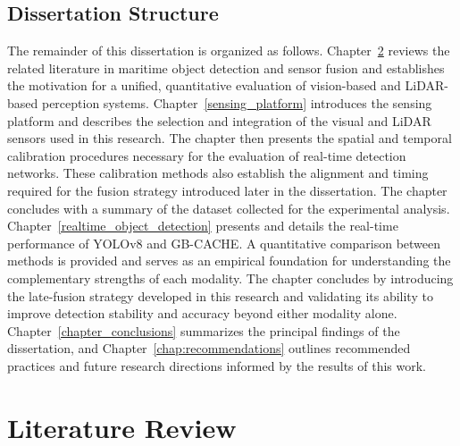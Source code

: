 \documentclass{erauthesis}
\begin{document}
\section{Dissertation Structure}
The remainder of this dissertation is organized as follows.  
Chapter~\ref{litReview} reviews the related literature in maritime object detection and sensor fusion and establishes the motivation for a unified, quantitative evaluation of vision-based and LiDAR-based perception systems.
Chapter~\ref{sensing_platform} introduces the sensing platform and describes the selection and integration of the visual and LiDAR sensors used in this research. The chapter then presents the spatial and temporal calibration procedures necessary for the evaluation of real-time detection networks. These calibration methods also establish the alignment and timing required for the fusion strategy introduced later in the dissertation. The chapter concludes with a summary of the dataset collected for the experimental analysis.
Chapter~\ref{realtime_object_detection} presents and details the real-time performance of YOLOv8 and GB-CACHE. A quantitative comparison between methods is provided and serves as an empirical foundation for understanding the complementary strengths of each modality. The chapter concludes by introducing the late-fusion strategy developed in this research and validating its ability to improve detection stability and accuracy beyond either modality alone.
Chapter~\ref{chapter_conclusions} summarizes the principal findings of the dissertation, and Chapter~\ref{chap:recommendations} outlines recommended practices and future research directions informed by the results of this work.


\chapter{Literature Review} \label{litReview}


\end{document}
